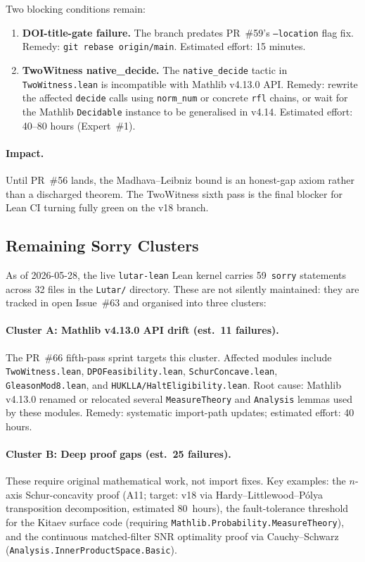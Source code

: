 \medskip

Two blocking conditions remain:
\begin{enumerate}
  \item \textbf{DOI-title-gate failure.}  The branch predates PR~\#59's
    \texttt{--location} flag fix.  Remedy: \texttt{git rebase origin/main}.
    Estimated effort: 15 minutes.
  \item \textbf{TwoWitness native\_decide.}  The \texttt{native\_decide}
    tactic in \texttt{TwoWitness.lean} is incompatible with Mathlib v4.13.0
    API.  Remedy: rewrite the affected \texttt{decide} calls using
    \texttt{norm\_num} or concrete \texttt{rfl} chains, or wait for the
    Mathlib \texttt{Decidable} instance to be generalised in v4.14.
    Estimated effort: 40--80 hours (Expert~\#1).
\end{enumerate}

\paragraph{Impact.}
Until PR~\#56 lands, the Madhava--Leibniz bound is an honest-gap axiom
rather than a discharged theorem.
The TwoWitness sixth pass is the final blocker for Lean CI turning fully
green on the v18 branch.

\subsection{Remaining Sorry Clusters}
\label{ssec:sorries}

As of 2026-05-28, the live \texttt{lutar-lean} Lean kernel carries
59~\texttt{sorry} statements across 32 files in the \texttt{Lutar/}
directory.
These are not silently maintained: they are tracked in open Issue~\#63
and organised into three clusters:

\paragraph{Cluster A: Mathlib v4.13.0 API drift (est.\ 11 failures).}
The PR~\#66 fifth-pass sprint targets this cluster.
Affected modules include \texttt{TwoWitness.lean},
\texttt{DPOFeasibility.lean}, \texttt{SchurConcave.lean},
\texttt{GleasonMod8.lean}, and \texttt{HUKLLA/HaltEligibility.lean}.
Root cause: Mathlib v4.13.0 renamed or relocated several
\texttt{MeasureTheory} and \texttt{Analysis} lemmas used by these modules.
Remedy: systematic import-path updates; estimated effort: 40 hours.

\paragraph{Cluster B: Deep proof gaps (est.\ 25 failures).}
These require original mathematical work, not import fixes.
Key examples: the \(n\)-axis Schur-concavity proof (A11; target: v18
via Hardy--Littlewood--P\'olya transposition decomposition,
estimated 80~hours), the fault-tolerance threshold for the Kitaev surface
code (requiring \texttt{Mathlib.Probability.MeasureTheory}), and the
continuous matched-filter SNR optimality proof via Cauchy--Schwarz
(\texttt{Analysis.InnerProductSpace.Basic}).


